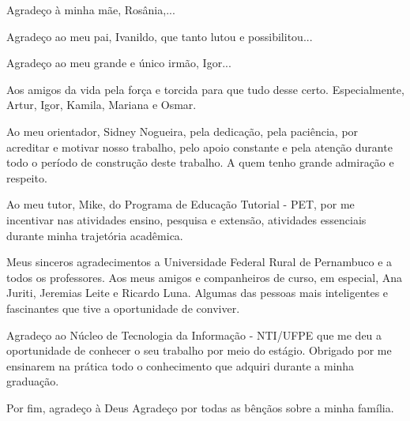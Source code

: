 \begin{agradecimentos}
Agradeço à minha mãe, Rosânia,...

Agradeço ao meu pai, Ivanildo, que tanto lutou e possibilitou...

Agradeço ao meu grande e único irmão, Igor...

Aos amigos da vida pela força e torcida para que tudo desse certo. Especialmente, Artur, Igor, Kamila, Mariana e Osmar.

Ao meu orientador, Sidney Nogueira, pela dedicação, pela paciência, por acreditar e motivar nosso trabalho, pelo apoio constante e pela atenção durante todo o período de construção deste trabalho. A quem tenho grande admiração e respeito.

Ao meu tutor, Mike, do Programa de Educação Tutorial - PET, por me incentivar nas atividades ensino, pesquisa e extensão, atividades essenciais durante minha trajetória acadêmica. 

Meus sinceros agradecimentos a Universidade Federal Rural de Pernambuco e a todos os professores. Aos meus amigos e companheiros de curso, em especial, Ana Juriti, Jeremias Leite e Ricardo Luna. Algumas das pessoas mais inteligentes e fascinantes que tive a oportunidade de conviver.

Agradeço ao Núcleo de Tecnologia da Informação - NTI/UFPE que me deu a oportunidade de conhecer o seu trabalho por meio do estágio. Obrigado por me ensinarem na prática todo o conhecimento que adquiri durante a minha graduação.

Por fim, agradeço à Deus Agradeço por todas as bênçãos sobre a minha família.

\end{agradecimentos}

